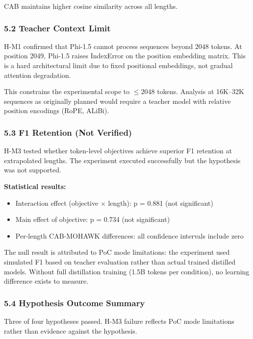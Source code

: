 CAB maintains higher cosine similarity across all lengths.

\subsubsection{5.2 Teacher Context Limit}

H-M1 confirmed that Phi-1.5 cannot process sequences beyond 2048 tokens. At position 2049, Phi-1.5 raises IndexError on the position embedding matrix. This is a hard architectural limit due to fixed positional embeddings, not gradual attention degradation.

This constrains the experimental scope to $\leq 2048$ tokens. Analysis at 16K--32K sequences as originally planned would require a teacher model with relative position encodings (RoPE, ALiBi).

\subsubsection{5.3 F1 Retention (Not Verified)}

H-M3 tested whether token-level objectives achieve superior F1 retention at extrapolated lengths. The experiment executed successfully but the hypothesis was not supported.

\textbf{Statistical results:}
\begin{itemize}
\item Interaction effect (objective $\times$ length): p = 0.881 (not significant)
\item Main effect of objective: p = 0.734 (not significant)
\item Per-length CAB-MOHAWK differences: all confidence intervals include zero
\end{itemize}

The null result is attributed to PoC mode limitations: the experiment used simulated F1 based on teacher evaluation rather than actual trained distilled models. Without full distillation training (1.5B tokens per condition), no learning difference exists to measure.

\subsubsection{5.4 Hypothesis Outcome Summary}

\begin{table}[htbp]
\centering
{}
\end{table}

Three of four hypotheses passed. H-M3 failure reflects PoC mode limitations rather than evidence against the hypothesis.


